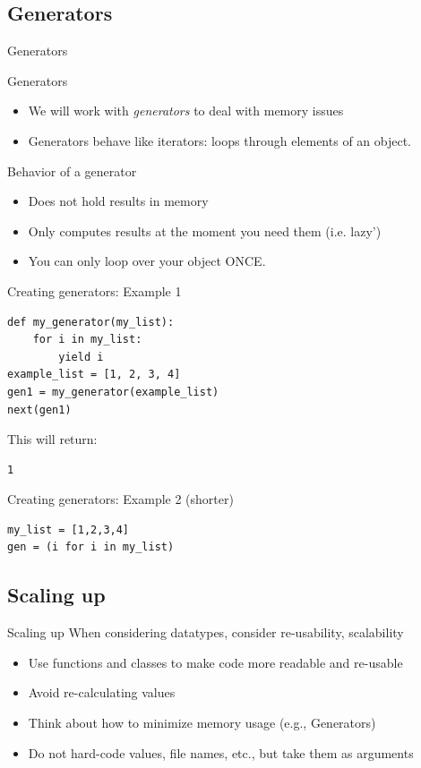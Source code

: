 \documentclass[compress]{beamer}
\begin{document}
\subsection{Generators}
\begin{frame}{Generators}
\begin{block}{Generators}
	\begin{itemize}[<+->]
		\item We will work with \textit{generators} to deal with memory issues
		\item Generators behave like iterators: loops through elements of an object. 
	\end{itemize}
\end{block}
\pause
\begin{exampleblock}{Behavior of a generator}
	\begin{itemize}[<+->]
		\item Does not hold results in memory
		\item Only computes results at the moment you need them (i.e. lazy')
		\item You can only loop over your object ONCE.
	\end{itemize}
\end{exampleblock}
\end{frame}

\begin{frame}
Creating generators: Example 1 
\begin{lstlisting}
def my_generator(my_list):	
    for i in my_list:
        yield i
example_list = [1, 2, 3, 4]
gen1 = my_generator(example_list)        
next(gen1)
\end{lstlisting}
This will return:
\begin{lstlisting}
1
\end{lstlisting}
\end{frame}


\begin{frame}
Creating generators: Example 2 (shorter)
\begin{lstlisting}
my_list = [1,2,3,4]
gen = (i for i in my_list)
\end{lstlisting}
\end{frame}


\subsection{Scaling up}
\begin{frame}{Scaling up}
When considering datatypes, consider re-usability, scalability
	\begin{itemize}
		\item Use functions and classes to make code more readable and re-usable
		\item Avoid re-calculating values
		\item Think about how to minimize memory usage (e.g., Generators)
		\item Do not hard-code values, file names, etc., but take them as arguments
	\end{itemize}	
\end{frame}
\end{document}
